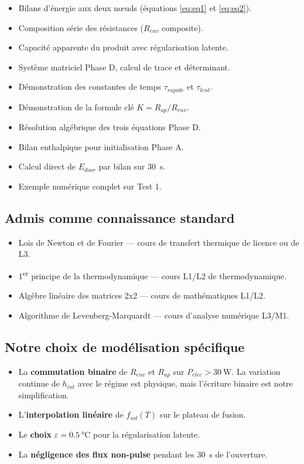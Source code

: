 \documentclass[11pt,a4paper]{article}
\begin{document}
\begin{itemize}[itemsep=0pt]
\item Bilans d'énergie aux deux nœuds (équations \ref{eq:eq1} et \ref{eq:eq2}). \checkmark
\item Composition série des résistances ($R_{env}$ composite). \checkmark
\item Capacité apparente du produit avec régularisation latente. \checkmark
\item Système matriciel Phase D, calcul de trace et déterminant. \checkmark
\item Démonstration des constantes de temps $\tau_{rapide}$ et $\tau_{lent}$. \checkmark
\item Démonstration de la formule clé $K = R_{ap}/R_{env}$. \checkmark
\item Résolution algébrique des trois équations Phase D. \checkmark
\item Bilan enthalpique pour initialisation Phase A. \checkmark
\item Calcul direct de $E_{door}$ par bilan sur \SI{30}{\second}. \checkmark
\item Exemple numérique complet sur Test 1. \checkmark
\end{itemize}

\subsection{Admis comme connaissance standard}

\begin{itemize}[itemsep=0pt]
\item Lois de Newton et de Fourier — cours de transfert thermique de licence ou de L3.
\item 1\textsuperscript{er} principe de la thermodynamique — cours L1/L2 de thermodynamique.
\item Algèbre linéaire des matrices 2x2 — cours de mathématiques L1/L2.
\item Algorithme de Levenberg-Marquardt — cours d'analyse numérique L3/M1.
\end{itemize}

\subsection{Notre choix de modélisation spécifique}

\begin{itemize}[itemsep=0pt]
\item La \textbf{commutation binaire} de $R_{env}$ et $R_{ap}$ sur $P_{elec} > \SI{30}{\watt}$.
La variation continue de $h_{int}$ avec le régime est physique, mais l'écriture binaire est
notre simplification.
\item L'\textbf{interpolation linéaire} de $f_{sol}(T)$ sur le plateau de fusion.
\item Le \textbf{choix} $\varepsilon = \SI{0,5}{\celsius}$ pour la régularisation latente.
\item La \textbf{négligence des flux non-pulse} pendant les \SI{30}{\second} de l'ouverture.
\end{itemize}
\end{document}
